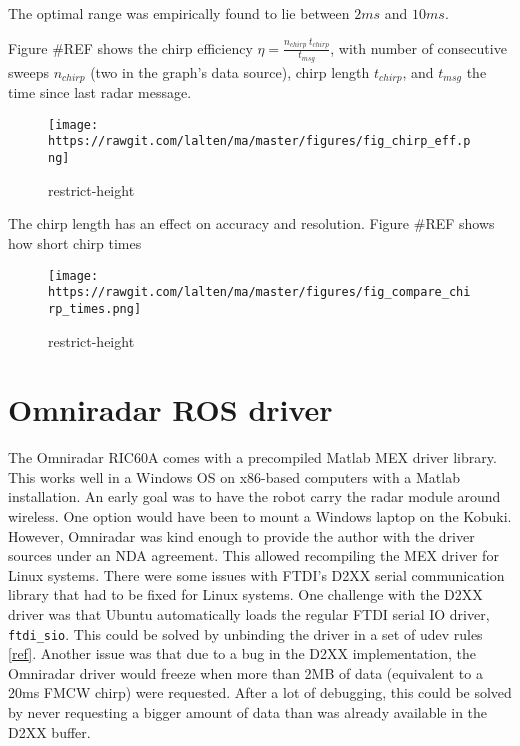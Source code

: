 The optimal range was empirically found to lie between \(2ms\) and
\(10ms\).

Figure \#REF shows the chirp efficiency
\(\eta = \frac{n_{chirp}~t_{chirp}}{t_{msg}}\), with number of
consecutive sweeps \(n_{chirp}\) (two in the graph's data source), chirp
length \(t_{chirp}\), and \(t_{msg}\) the time since last radar message.

\begin{figure}
\centering
\texttt{[image: https://rawgit.com/lalten/ma/master/figures/fig\_chirp\_eff.png]}
\caption{restrict-height}
\end{figure}

The chirp length has an effect on accuracy and resolution. Figure \#REF
shows how short chirp times

\begin{figure}
\centering
\texttt{[image: https://rawgit.com/lalten/ma/master/figures/fig\_compare\_chirp\_times.png]}
\caption{restrict-height}
\end{figure}



\section{Omniradar ROS driver}\label{omniradar-ros-driver}

The Omniradar RIC60A comes with a precompiled Matlab MEX driver library.
This works well in a Windows OS on x86-based computers with a Matlab
installation. An early goal was to have the robot carry the radar module
around wireless. One option would have been to mount a Windows laptop on
the Kobuki. However, Omniradar was kind enough to provide the author
with the driver sources under an NDA agreement. This allowed recompiling
the MEX driver for Linux systems. There were some issues with FTDI's
D2XX serial communication library that had to be fixed for Linux
systems. One challenge with the D2XX driver was that Ubuntu
automatically loads the regular FTDI serial IO driver,
\texttt{ftdi\_sio}. This could be solved by unbinding the driver in a
set of udev rules
\href{https://stackoverflow.com/questions/44529376}{{[}ref{]}}. Another
issue was that due to a bug in the D2XX implementation, the Omniradar
driver would freeze when more than 2MB of data (equivalent to a 20ms
FMCW chirp) were requested. After a lot of debugging, this could be
solved by never requesting a bigger amount of data than was already
available in the D2XX buffer.

